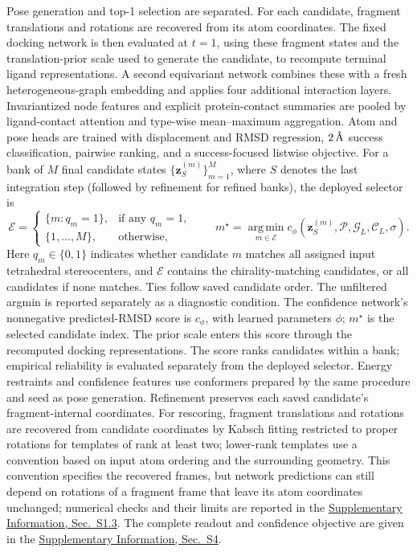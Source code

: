 \documentclass{article}
\newcommand{\angstrom}{\text{\normalfont\AA}}
\newcommand{\sisection}[1]{\href{SI.pdf}{Supplementary Information, Sec.~#1}}
\begin{document}
Pose generation and top-1 selection are separated.
For each candidate, fragment translations and rotations are recovered from its atom coordinates. The fixed docking network is then evaluated at \(t=1\), using these fragment states and the translation-prior scale used to generate the candidate, to recompute terminal ligand representations. A second equivariant network combines these with a fresh heterogeneous-graph embedding and applies four additional interaction layers.
Invariantized node features and explicit protein-contact summaries are pooled by ligand-contact attention and type-wise mean--maximum aggregation.
Atom and pose heads are trained with displacement and RMSD regression, \(2\,\angstrom\) success classification, pairwise ranking, and a success-focused listwise objective.
For a bank of \(M\) final candidate states \(\{\mathbf z_S^{(m)}\}_{m=1}^{M}\), where \(S\) denotes the last integration step (followed by refinement for refined banks), the deployed selector is
\begin{equation}
    \mathcal E=\begin{cases}
       \{m:q_m=1\}, & \text{if any }q_m=1,\\
       \{1,\ldots,M\}, & \text{otherwise},
    \end{cases}
    \qquad
    m^\star=\operatorname*{arg\,min}_{m\in\mathcal E}
    c_\phi\!\left(\mathbf z_S^{(m)},\mathcal P,\mathcal G_L,\mathcal C_L,\sigma\right).
    \label{eq:confidence_selection}
\end{equation}
Here \(q_m\in\{0,1\}\) indicates whether candidate \(m\) matches all assigned input tetrahedral stereocenters, and \(\mathcal E\) contains the chirality-matching candidates, or all candidates if none matches. Ties follow saved candidate order. The unfiltered argmin is reported separately as a diagnostic condition.
The confidence network's nonnegative predicted-RMSD score is \(c_\phi\), with learned parameters \(\phi\); \(m^\star\) is the selected candidate index.
The prior scale enters this score through the recomputed docking representations.
The score ranks candidates within a bank; empirical reliability is evaluated separately from the deployed selector.
Energy restraints and confidence features use conformers prepared by the same procedure and seed as pose generation. Refinement preserves each saved candidate's fragment-internal coordinates. For rescoring, fragment translations and rotations are recovered from candidate coordinates by Kabsch fitting restricted to proper rotations for templates of rank at least two; lower-rank templates use a convention based on input atom ordering and the surrounding geometry. This convention specifies the recovered frames, but network predictions can still depend on rotations of a fragment frame that leave its atom coordinates unchanged; numerical checks and their limits are reported in the \sisection{S1.3}.
The complete readout and confidence objective are given in the \sisection{S4}.
\end{document}
